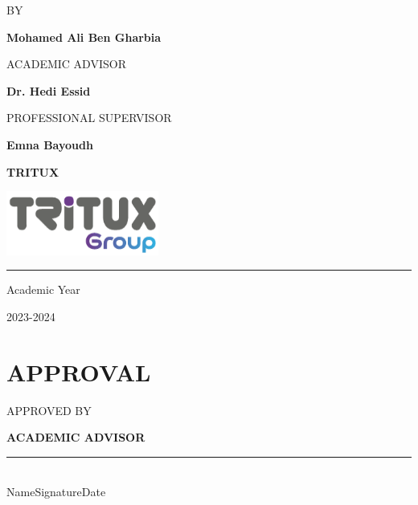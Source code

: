 \documentclass[11pt, a4paper]{report}
\renewcommand{\Large}{\fontsize{14pt}{19pt}\selectfont}
\renewcommand{\large}{\fontsize{13pt}{19pt}\selectfont}
\begin{document}
\begin{titlepage}
      {\large BY\par \textbf {Mohamed Ali Ben Gharbia} \par}
      \vspace{1.5cm}
      {\large ACADEMIC ADVISOR \par}
      {\textbf{Dr. Hedi Essid }\par}
      \vspace{1cm}
      {\large PROFESSIONAL SUPERVISOR \par}
      {\textbf{Emna Bayoudh  }\par}
      {\textbf{TRITUX}\par}
      \vspace{0.5cm}
      \includegraphics[width=5cm]{Logos/tritux.png}



      
      \vfill %
      \rule{\textwidth}{1pt} %
      {\Large Academic Year \par 2023-2024}
      
      
    \end{titlepage}

    \newpage
      \thispagestyle{plain} %
      \chapter*{APPROVAL}
      \vspace{1cm} 
      
      APPROVED BY
      
      \vspace{1cm} %
      
      \noindent \textbf {ACADEMIC ADVISOR}
      
      \vspace{1cm} 
      \noindent \rule{\textwidth}{0.01pt} \\
      \noindent Name\hfill Signature\hfill Date

      \vspace{1cm} %
      
\end{document}
